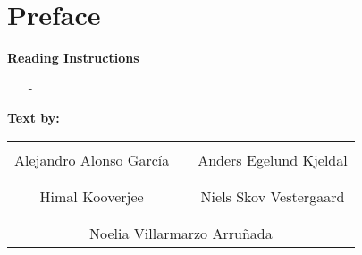\chapter*{Preface}
\vspace{-12 pt}
\lipsum[3]

\textbf{Reading Instructions}
\vspace{-10 pt}
\begin{itemize}
\item[-] \lipsum[6]
\end{itemize}

%
\textbf{Text by:}\\
\vspace{-12 pt}
\begin{table}[H]
	\centering
		\begin{tabular}{c c c}
			\underline{\phantom{JAERJAERJAERJAERGO}} & \phantom{cookies} & \underline{\phantom{JAERJAERJAERJAERGO}} \\
			Alejandro Alonso García & \phantom{cookies} & Anders Egelund Kjeldal \\
			&&\\
			\underline{\phantom{JAERJAERJAERJAERGO}} & \phantom{cookies} & \underline{\phantom{JAERJAERJAERJAERGO}} \\
			Himal Kooverjee & \phantom{cookies} & Niels Skov Vestergaard		\\
			&&\\
	    \multicolumn{3}{c}{\underline{\phantom{JAERJAERJAERJAERGO}}}\\
	    \multicolumn{3}{c}{Noelia Villarmarzo Arruñada}\\				
		\end{tabular}
\end{table}
\pagebreak